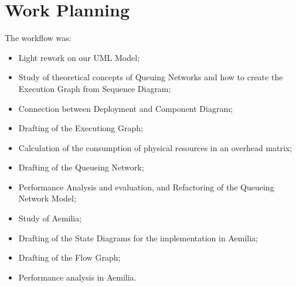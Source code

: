 \chapter{\textbf{Work Planning}}

The workflow was:

\begin{itemize}
	\item Light rework on our UML Model;
	\item Study of theoretical concepts of Queuing Networks and how to 			create the Execution Graph from Sequence Diagram;
	\item Connection between Deployment and Component Diagram;
	\item Drafting of the Executiong Graph;
	\item Calculation of the consumption of physical resources in an 			overhead matrix;
	\item Drafting of the Queueing Network;
	\item Performance Analysis and evaluation, and Refactoring of the 			Queueing Network Model;
	\item Study of Aemilia;
	\item Drafting of the State Diagrams for the implementation in 				Aemilia;
	\item Drafting of the Flow Graph;
	\item Performance analysis in Aemilia.	
\end{itemize}

